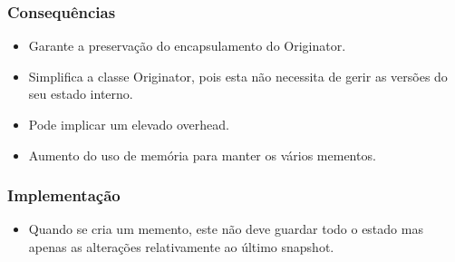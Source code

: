 \subsubsection{Consequências}
\begin{itemize}
\item Garante a preservação do encapsulamento do Originator.
\item Simplifica a classe Originator, pois esta não necessita de gerir as versões do seu estado interno.
\item Pode implicar um elevado overhead.
\item Aumento do uso de memória para manter os vários mementos.
\end{itemize}

\subsubsection{Implementação}
\begin{itemize}
\item Quando se cria um memento, este não deve guardar todo o estado mas apenas as alterações relativamente ao último snapshot.
\end{itemize}